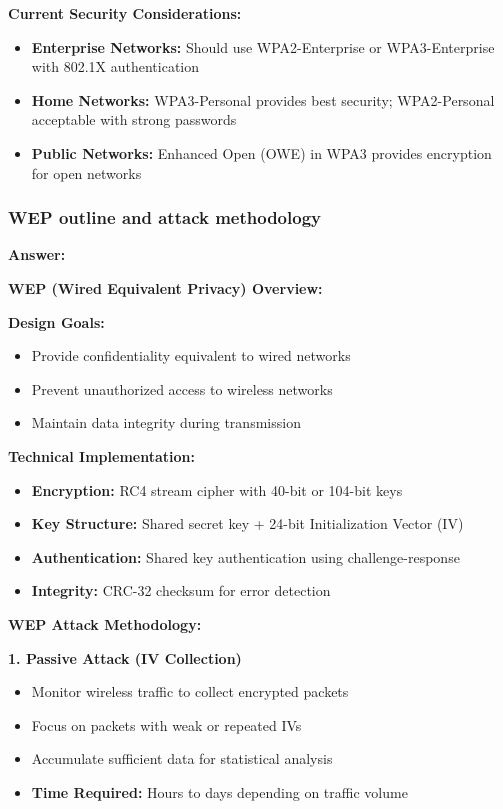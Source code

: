 \documentclass[12pt,a4paper]{article}
\begin{document}
\textbf{Current Security Considerations:}
\begin{itemize}
    \item \textbf{Enterprise Networks:} Should use WPA2-Enterprise or WPA3-Enterprise with 802.1X authentication
    \item \textbf{Home Networks:} WPA3-Personal provides best security; WPA2-Personal acceptable with strong passwords
    \item \textbf{Public Networks:} Enhanced Open (OWE) in WPA3 provides encryption for open networks
\end{itemize}

\subsubsection{WEP outline and attack methodology}

\textbf{Answer:}

\textbf{WEP (Wired Equivalent Privacy) Overview:}

\textbf{Design Goals:}
\begin{itemize}
    \item Provide confidentiality equivalent to wired networks
    \item Prevent unauthorized access to wireless networks
    \item Maintain data integrity during transmission
\end{itemize}

\textbf{Technical Implementation:}
\begin{itemize}
    \item \textbf{Encryption:} RC4 stream cipher with 40-bit or 104-bit keys
    \item \textbf{Key Structure:} Shared secret key + 24-bit Initialization Vector (IV)
    \item \textbf{Authentication:} Shared key authentication using challenge-response
    \item \textbf{Integrity:} CRC-32 checksum for error detection
\end{itemize}

\textbf{WEP Attack Methodology:}

\textbf{1. Passive Attack (IV Collection)}
\begin{itemize}
    \item Monitor wireless traffic to collect encrypted packets
    \item Focus on packets with weak or repeated IVs
    \item Accumulate sufficient data for statistical analysis
    \item \textbf{Time Required:} Hours to days depending on traffic volume
\end{itemize}
\end{document}
